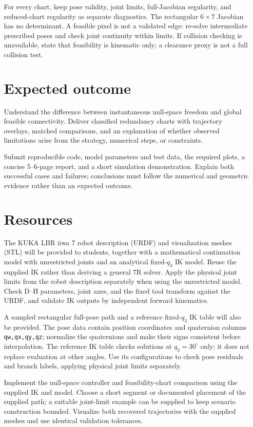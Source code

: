 \documentclass[11pt,a4paper]{article}
\begin{document}
For every chart, keep pose validity, joint limits,
full-Jacobian regularity, and reduced-chart regularity as separate diagnostics.
The rectangular $6\times7$ Jacobian has no determinant. A feasible pixel is
not a validated edge: re-solve intermediate prescribed poses and check joint
continuity within limits. If collision checking is unavailable, state that
feasibility is kinematic only; a clearance proxy is not a full collision test.

\section*{Expected outcome}
Understand the difference between instantaneous null-space freedom
and global feasible connectivity. Deliver classified redundancy charts with
trajectory overlays, matched comparisons, and an explanation of whether
observed limitations arise from the strategy, numerical steps, or constraints.

Submit reproducible code, model parameters and test data, the required plots,
a concise 5--6-page report, and a short simulation demonstration. Explain
both successful cases and failures; conclusions must follow the numerical
and geometric evidence rather than an expected outcome.

\section*{Resources}
The KUKA LBR iiwa 7 robot description (URDF) and visualization meshes
(STL) will be provided to students, together with a mathematical continuation
model with unrestricted joints and an analytical fixed-$q_3$ IK model. Reuse
the supplied IK rather than deriving a general 7R solver. Apply the physical
joint limits from the robot description separately when using the unrestricted
model. Check D--H parameters, joint axes, and the fixed tool transform against
the URDF, and validate IK outputs by independent forward kinematics.

A sampled rectangular full-pose path and a reference fixed-$q_3$ IK
table will also be provided. The pose data contain position coordinates and
quaternion columns \texttt{qw,qx,qy,qz}; normalize the quaternions and make
their signs consistent before interpolation. The reference IK table checks
solutions at $q_3=30^\circ$ only; it does not replace evaluation at other angles.
Use its configurations to check pose residuals and branch labels, applying
physical joint limits separately.

Implement the null-space controller and feasibility-chart comparison using
the supplied IK and model. Choose a short segment or documented placement of
the supplied path; a suitable joint-limit example can be supplied to keep
scenario construction bounded. Visualize both recovered trajectories with
the supplied meshes and use identical validation tolerances.
\end{document}
